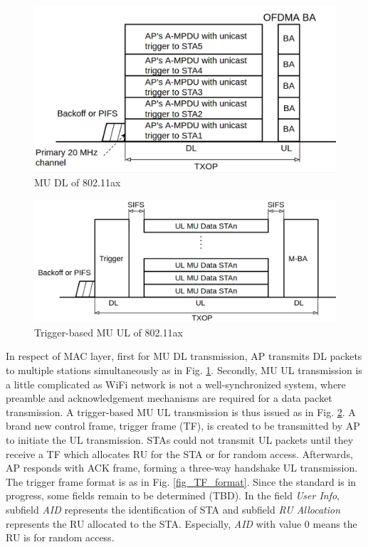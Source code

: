 \documentclass[journal]{IEEEtran}
\begin{document}
\begin{figure}[!t]
\includegraphics[scale=0.23]{./figure/fig_MU_DL.png}
\caption{MU DL of 802.11ax}
\label{fig_MU_DL}
\end{figure}


\begin{figure}[!t]
\includegraphics[scale=0.21]{./figure/fig_MU_UL.png}
\caption{Trigger-based MU UL of 802.11ax}
\label{fig_MU_UL}
\end{figure}

In respect of MAC layer, first for MU DL transmission, AP transmits DL packets to multiple stations simultaneously as in Fig. \ref{fig_MU_DL}.
Secondly, MU UL transmission is a little complicated as WiFi network is not a well-synchronized system, where preamble and acknowledgement mechanisms are required for a data packet transmission. 
A trigger-based MU UL transmission is thus issued as in Fig. \ref{fig_MU_UL}.
A brand new control frame, trigger frame (TF), is created to be transmitted by AP to initiate the UL transmission.
STAs could not transmit UL packets until they receive a TF which allocates RU for the STA or for random access. 
Afterwards, AP responds with ACK frame, forming a three-way handshake UL transmission. 
The trigger frame format is as in Fig. \ref{fig_TF_format}. 
Since the standard is in progress, some fields remain to be determined (TBD). 
In the field \textit{User Info}, subfield \textit{AID} represents the identification of STA and subfield \textit{RU Allocation} represents the RU allocated to the STA.
Especially, \textit{AID} with value 0 means the RU is for random access.
\end{document}
